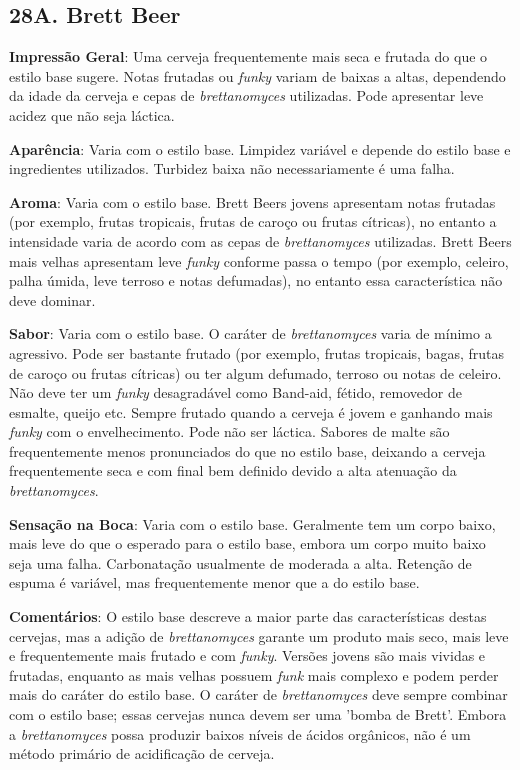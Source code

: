 \subsection*{28A. Brett Beer}
\textbf{Impressão Geral}: Uma cerveja frequentemente mais seca e frutada do que o estilo base sugere. Notas frutadas ou \textit{funky} variam de baixas a altas, dependendo da idade da cerveja e cepas de \textit{brettanomyces} utilizadas. Pode apresentar leve acidez que não seja láctica.

\textbf{Aparência}: Varia com o estilo base. Limpidez variável e depende do estilo base e ingredientes utilizados. Turbidez baixa não necessariamente é uma falha.

\textbf{Aroma}: Varia com o estilo base. Brett Beers jovens apresentam notas frutadas (por exemplo, frutas tropicais, frutas de caroço ou frutas cítricas), no entanto a intensidade varia de acordo com as cepas de \textit{brettanomyces} utilizadas. Brett Beers mais velhas apresentam leve \textit{funky} conforme passa o tempo (por exemplo, celeiro, palha úmida, leve terroso e notas defumadas), no entanto essa característica não deve dominar.

\textbf{Sabor}: Varia com o estilo base. O caráter de \textit{brettanomyces} varia de mínimo a agressivo. Pode ser bastante frutado (por exemplo, frutas tropicais, bagas, frutas de caroço ou frutas cítricas) ou ter algum defumado, terroso ou notas de celeiro. Não deve ter um \textit{funky} desagradável como Band-aid, fétido, removedor de esmalte, queijo etc. Sempre frutado quando a cerveja é jovem e ganhando mais \textit{funky} com o envelhecimento. Pode não ser láctica. Sabores de malte são frequentemente menos pronunciados do que no estilo base, deixando a cerveja frequentemente seca e com final bem definido devido a alta atenuação da \textit{brettanomyces}.

\textbf{Sensação na Boca}: Varia com o estilo base. Geralmente tem um corpo baixo, mais leve do que o esperado para o estilo base, embora um corpo muito baixo seja uma falha. Carbonatação usualmente de moderada a alta. Retenção de espuma é variável, mas frequentemente menor que a do estilo base.

\textbf{Comentários}: O estilo base descreve a maior parte das características destas cervejas, mas a adição de \textit{brettanomyces} garante um produto mais seco, mais leve e frequentemente mais frutado e com \textit{funky}. Versões jovens são mais vividas e frutadas, enquanto as mais velhas possuem \textit{funk} mais complexo e podem perder mais do caráter do estilo base. O caráter de \textit{brettanomyces} deve sempre combinar com o estilo base; essas cervejas nunca devem ser uma 'bomba de Brett'. Embora a \textit{brettanomyces} possa produzir baixos níveis de ácidos orgânicos, não é um método primário de acidificação de cerveja.

